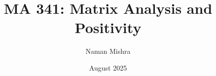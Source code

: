 \documentclass[12pt]{report}
\title{MA 341: Matrix Analysis and Positivity}
\author{Naman Mishra}
\date{August 2025}
\begin{document}
\maketitle
\tableofcontents
\listoflecture
    
\end{document}
